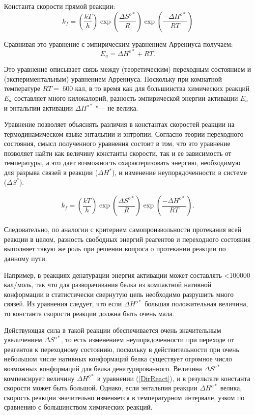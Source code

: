 \documentclass[12pt,a4paper,oneside]{book}
\begin{document}
Константа скорости прямой реакции: 
\begin{equation}
	k_f =\left(\frac{k T}{h} \right) \exp \left(\dfrac{\Delta S^{o*}}{R}\right) \exp \left(\dfrac{-\Delta H^{o*}}{RT}\right) 
\end{equation}

Сравнивая это уравнение с эмпирическим уравнением Аррениуса получаем:
\begin{equation}
	E_a = \Delta H^{o*} + RT.
\end{equation}

Это уравнение описывает связь между (теоретическим) переходным состоянием и (экспериментальным) уравнением Аррениуса. Поскольку при комнатной температуре $ RT=~600 $ кал, в то время как для большинства химических реакций $ E_a $ составляет много килокалорий, разность эмпирической энергии активации $ E_a $ и энтальпии активации $ \Delta H^{o*} $ "--- не велика.

Уравнение позволяет объяснять различия в константах скоростей реакции на термодинамическом языке энтальпии и энтропии.
Согласно теории переходного состояния, смысл полученного уравнения состоит в том, что это уравнение позволяет найти как величину константы скорости, так и ее зависимость от температуры, а это дает возможность охарактеризовать энергию, необходимую для разрыва связей в реакции ($ \Delta H^{*} $), и изменение неупорядоченности в системе ($ \Delta S^{*} $). 

\begin{align}
\label{DirReact} 
k_f = \left( \dfrac{kT}{h} \right) \exp \left( \dfrac{\Delta S^{o*}}{R} \right) \exp \left( \dfrac{- \Delta H^{o*}}{RT} \right).
\end{align}

Следовательно, по аналогии с критерием самопроизвольности протекания всей реакции в целом, разность свободных энергий реагентов и переходного состояния выполняет такую же роль при решении вопроса о протекании реакции по данному пути.

Например, в реакциях денатурации энергия активации может составлять <100000 кал/моль, так что для разворачивания белка из компактной нативной конформации в статистически свернутую цепь необходимо разрушить много связей. Из уравнения следует, что если $ \Delta H^{o*} $ большая положительная величина, то константа скорости реакции должна быть очень мала. 

Действующая сила в такой реакции обеспечивается очень значительным увеличением  $ \Delta S^{o*} $, то есть изменением неупорядоченности при переходе от реагентов к переходному состоянию, поскольку в действительности при очень небольшом числе нативных конформаций белка существует огромное число возможных конформаций для белка денатурированного. Величина $ \Delta S^{o*} $ компенсирует величину $ \Delta H^{o*} $ в уравнении (\ref{DirReact}), и в результате константа скорости может быть большой.  Однако, если энтальпия реакции $ \Delta H^{o*} $ велика, скорость реакции значительно изменяется в температурном интервале, узком по сравнению с большинством химических реакций. 
\end{document}
